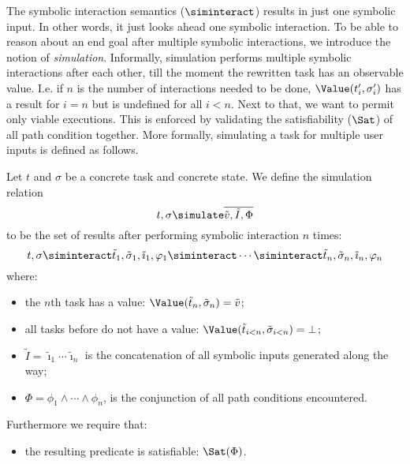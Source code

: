 The symbolic interaction semantics ($\siminteract$) results in just one symbolic input.
In other words, it just looks ahead one symbolic interaction.
To be able to reason about an end goal after multiple symbolic interactions,
we introduce the notion of \emph{simulation}.
Informally, simulation performs multiple symbolic interactions after each other,
till the moment the rewritten task has an observable value.
I.e. if $n$ is the number of interactions needed to be done,
$\Value(t_i', \sigma_i')$ has a result for $i = n$ but is undefined for all $i < n$.
Next to that, we want to permit only viable executions.
This is enforced by validating the satisfiability ($\Sat$) of all path condition together.
More formally, simulating a task for multiple user inputs is defined as follows.

\begin{definition}[Simulation]
  Let $t$ and $\sigma$ be a concrete task and concrete state.
  We define the simulation relation
  \begin{equation*}
    t,\sigma \simulate \overline{\tilde{v},\tilde{I},\Phi}
  \end{equation*}
  to be the set of results after performing symbolic interaction $n$ times:
  \begin{equation*}
      t,\sigma
        \siminteract \tilde{t}_1,\tilde{\sigma}_1,\tilde{\imath}_1,\phi_1
        \siminteract \cdots
        \siminteract \tilde{t}_n,\tilde{\sigma}_n,\tilde{\imath}_n,\phi_n
  \end{equation*}
  where:
  \begin{itemize}
    \item the $n$th task has a value: $\Value(\tilde{t}_n,\tilde{\sigma}_n) = \tilde{v}$;
    \item all tasks before do not have a value: $\Value(\tilde{t}_{i<n},\tilde{\sigma}_{i<n}) = \bot$;
    \item $\tilde{I} = \tilde{\imath}_1 \cdots \tilde{\imath}_n$ is the concatenation of all symbolic inputs generated along the way;
    \item $\Phi = \phi_1 \land \cdots \land \phi_n$, is the conjunction of all path conditions encountered.
  \end{itemize}
  Furthermore we require that:
  \begin{itemize}
    \item the resulting predicate is satisfiable: $\Sat(\Phi)$.
  \end{itemize}
\end{definition}

